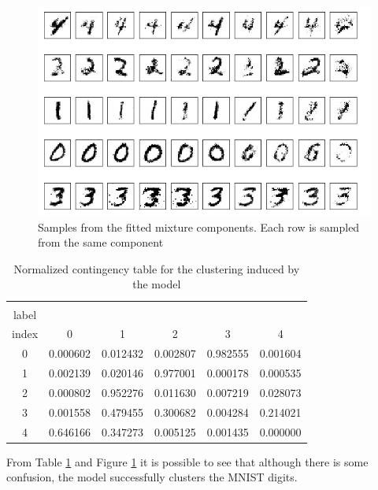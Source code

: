 \begin{figure}[!htb]
  \centering
  \includegraphics[width=0.85\linewidth]{figures/trained_mnist.png}
  \caption{Samples from the fitted mixture components. Each row is sampled
  from the same component}
  \label{fig:mnist_samples}
\end{figure}

\begin{table}[h]
\centering
\begin{tabular}{cccccc}
\toprule
\diagbox[trim=lr]{True\\label}{Cluster\\index} &         0 &         1 &         2 &         3 &         4 \\
\midrule
0    &  0.000602 &  0.012432 &  0.002807 &  0.982555 &  0.001604 \\
1    &  0.002139 &  0.020146 &  0.977001 &  0.000178 &  0.000535 \\
2    &  0.000802 &  0.952276 &  0.011630 &  0.007219 &  0.028073 \\
3    &  0.001558 &  0.479455 &  0.300682 &  0.004284 &  0.214021 \\
4    &  0.646166 &  0.347273 &  0.005125 &  0.001435 &  0.000000 \\
\bottomrule
\end{tabular}
\caption{Normalized contingency table for the clustering induced by the model}
\label{table:contingency}
\end{table}

From Table \ref{table:contingency} and Figure \ref{fig:mnist_samples} it is possible
to see that although there is some confusion, the model successfully clusters
the MNIST digits.
